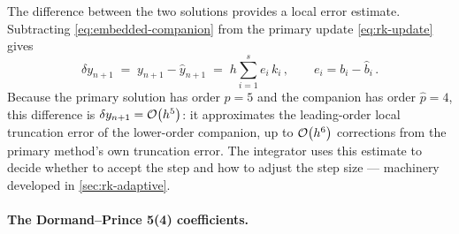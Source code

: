 The difference between the two solutions provides a local error
estimate.  Subtracting \cref{eq:embedded-companion} from the primary
update \cref{eq:rk-update} gives
%
\begin{equation}
  \delta y_{n+1} \;=\; y_{n+1} - \hat{y}_{n+1}
  \;=\; h \sum_{i=1}^{s} e_i\,k_i \,,
  \qquad e_i = b_i - \hat{b}_i \,.
  \label{eq:embedded-error}
\end{equation}
%
Because the primary solution has order $p = 5$ and the companion has
order $\hat{p} = 4$, this difference is $\delta y_{n+1} = \mathcal{O}\!\left(h^5\right)$:
it approximates the leading-order local truncation error of the
lower-order companion, up to $\mathcal{O}\!\left(h^6\right)$ corrections from the primary
method's own truncation error.  The integrator uses this estimate to
decide whether to accept the step and how to adjust the step size ---
machinery developed in \cref{sec:rk-adaptive}.

\paragraph{The Dormand--Prince 5(4) coefficients.}

